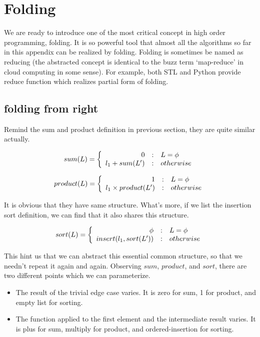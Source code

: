 \documentclass[b5paper]{article}
\begin{document}
\section{Folding}
 \label{sec:fold}

We are ready to introduce one of the most critical concept in high order programming, folding. It is so powerful tool
that almost all the algorithms so far in this appendix can be realized by folding. Folding is sometimes be named as
reducing (the abstracted concept is identical to the buzz term `map-reduce' in cloud computing in some sense). For example,
both STL and Python provide reduce function which realizes partial form of folding.

\subsection{folding from right}
Remind the sum and product definition in previous section, they are quite similar actually.

\[
sum(L) =  \left \{
  \begin{array}
  {r@{\quad:\quad}l}
  0 & L = \phi \\
  l_1 + sum(L') & otherwise
  \end{array}
\right.
\]

\[
product(L) = \left \{
  \begin{array}
  {r@{\quad:\quad}l}
  1 & L = \phi \\
  l_1 \times product(L') & otherwise
  \end{array}
\right.
\]

It is obvious that they have same structure. What's more, if we list the insertion sort definition, we can
find that it also shares this structure.

\[
sort(L) = \left \{
  \begin{array}
  {r@{\quad:\quad}l}
  \phi & L = \phi \\
  insert(l_1, sort(L')) & otherwise
  \end{array}
\right.
\]

This hint us that we can abstract this essential common structure, so that we needn't repeat it again and again.
Observing $sum$, $product$, and $sort$, there are two different points which we can parameterize.

\begin{itemize}
\item The result of the trivial edge case varies. It is zero for sum, 1 for product, and empty list for sorting.
\item The function applied to the first element and the intermediate result varies. It is plus for sum, multiply for product,
and ordered-insertion for sorting.
\end{itemize}
\end{document}
